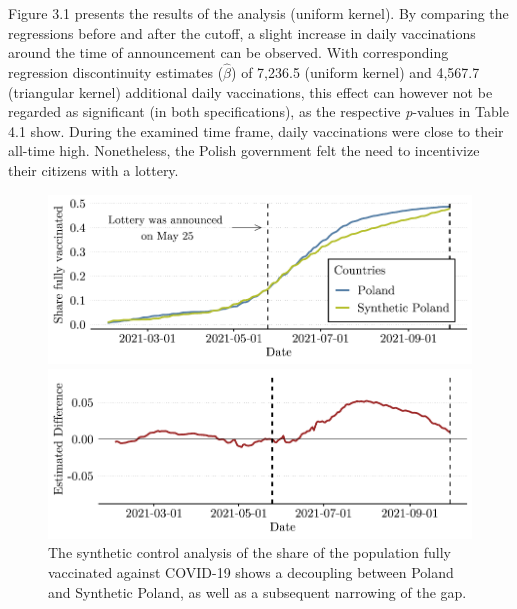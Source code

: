 \documentclass{scrbook}
\begin{document}
Figure 3.1 presents the results of the analysis (uniform kernel). By
comparing the regressions before and after the cutoff, a slight increase
in daily vaccinations around the time of announcement can be observed.
With corresponding regression discontinuity estimates (\(\hat{\beta}\))
of 7,236.5 (uniform kernel) and 4,567.7 (triangular kernel) additional
daily vaccinations, this effect can however not be regarded as
significant (in both specifications), as the respective
\textit{p}-values in Table 4.1 show. During the examined time frame,
daily vaccinations were close to their all-time high. Nonetheless, the
Polish government felt the need to incentivize their citizens with a
lottery.

\begin{figure}[h]
\caption[Synthetic control analysis of the Polish lottery (share of the fully vaccinated)]{The synthetic control analysis of the share of the population fully vaccinated against COVID-19 shows a decoupling between Poland and Synthetic Poland, as well as a subsequent narrowing of the gap.}

\begin{center}\includegraphics{bachelor_thesis_files/figure-latex/unnamed-chunk-3-1} \end{center}



\begin{center}\includegraphics{bachelor_thesis_files/figure-latex/unnamed-chunk-3-2} \end{center}
\end{figure}
\end{document}
